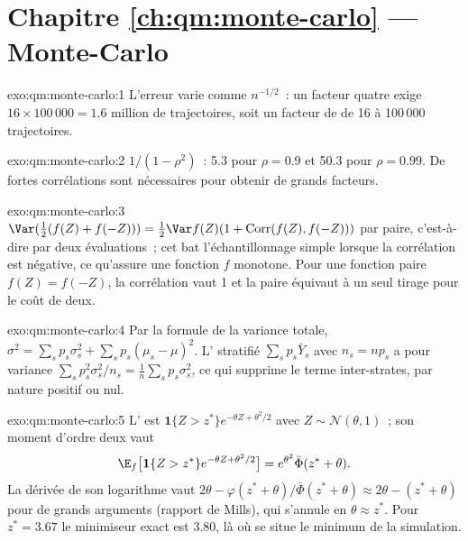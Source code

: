\section*{Chapitre \ref{ch:qm:monte-carlo} --- Monte-Carlo}

\begin{solution}{exo:qm:monte-carlo:1}
L'erreur varie comme $n^{-1/2}$~: un facteur quatre exige $16 \times 100\,000 = 1.6$ million de trajectoires, soit un facteur de  de 16 à 100\,000 trajectoires.
\end{solution}

\begin{solution}{exo:qm:monte-carlo:2}
$1/(1 - \rho^2)$~: 5.3 pour $\rho = 0.9$ et 50.3 pour $\rho = 0.99$. De fortes corrélations sont nécessaires pour obtenir de grands facteurs.
\end{solution}

\begin{solution}{exo:qm:monte-carlo:3}
$\Var(\frac12(f(Z) + f(-Z))) = \frac12\Var f(Z)(1 + \mathrm{Corr}(f(Z), f(-Z)))$ par paire, c'est-à-dire par deux évaluations~; cet  bat l'échantillonnage simple lorsque la corrélation est négative, ce qu'assure une fonction $f$
monotone. Pour une fonction paire $f(Z) = f(-Z)$, la corrélation vaut 1 et la paire équivaut à un seul tirage pour le coût de deux.
\end{solution}

\begin{solution}{exo:qm:monte-carlo:4}
Par la formule de la variance totale, $\sigma^2 = \sum_sp_s\sigma_s^2 + \sum_sp_s(\mu_s - \mu)^2$. L' stratifié $\sum_sp_s\bar Y_s$ avec $n_s = np_s$ a pour variance $\sum_sp_s^2\sigma_s^2/n_s =
\frac1n\sum_sp_s\sigma_s^2$, ce qui supprime le terme inter-strates, par nature positif ou nul.
\end{solution}

\begin{solution}{exo:qm:monte-carlo:5}
L' est $\mathbf 1\{Z > z^*\}e^{-\theta Z + \theta^2/2}$ avec $Z \sim \mathcal N(\theta, 1)$~; son moment d'ordre deux vaut
\[\E_f\bigl[\mathbf 1\{Z > z^*\}e^{-\theta Z + \theta^2/2}\bigr] = e^{\theta^2}\bar\Phi(z^* + \theta).\]
La dérivée de son logarithme vaut $2\theta - \varphi(z^* + \theta)/\bar\Phi(z^* + \theta) \approx 2\theta - (z^* + \theta)$ pour de grands arguments (rapport de Mills), qui s'annule en $\theta \approx z^*$. Pour $z^* = 3.67$
le minimiseur exact est 3.80, là où se situe le minimum de la simulation.
\end{solution}

